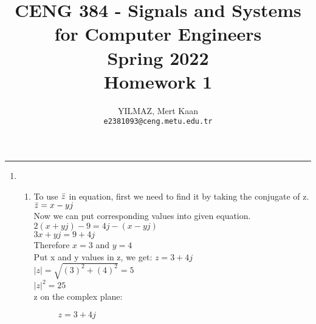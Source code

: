 \documentclass[10pt,a4paper, margin=1in]{article}
\author{
  YILMAZ, Mert Kaan\\
  \texttt{e2381093@ceng.metu.edu.tr}
}
\title{CENG 384 - Signals and Systems for Computer Engineers \\
Spring 2022 \\
Homework 1}
\begin{document}
\maketitle



\noindent\rule{19cm}{1.2pt}

\begin{enumerate}

\item %
    \begin{enumerate}
    \item To use $\Bar{z}$ in equation, first we need to find it by taking the conjugate of z.\\
    $\Bar{z} = x - yj$\\
    Now we can put corresponding values into given equation.\\
    $2(x + yj) - 9 = 4j - (x - yj)$\\
    $3x + yj = 9 + 4j$\\
    Therefore $x = 3$ and $y = 4$\\
    Put x and y values in z, we get: $z = 3 + 4j$\\
    $|z| = \sqrt{(3)^2 + (4)^2} = 5$ \\
    $|z|^2 = 25$ \\
    z on the complex plane:
    \begin{figure}[h!]
    \centering
        \caption{$z = 3 + 4j$}
        \label{fig:fig1}
    \end{figure}
    

\end{enumerate}
\end{enumerate}
\end{document}
